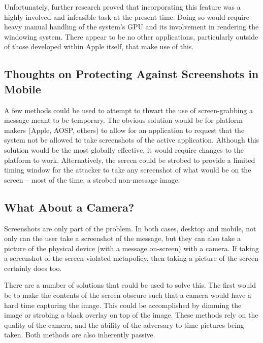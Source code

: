 \documentclass[11pt, a4paper,titlepage]{report}
\begin{document}
Unfortunately, further research proved that incorporating this feature was a highly involved and infeasible task at the present time. Doing so would require heavy manual handling of the system's GPU and its involvement in rendering the windowing system. There appear to be no other applications, particularly outside of those developed within Apple itself, that make use of this.

\subsection*{Thoughts on Protecting Against Screenshots in Mobile} 
A few methods could be used to attempt to thwart the use of screen-grabbing a message meant to be temporary. The obvious solution would be for platform-makers (Apple, AOSP, others) to allow for an application to request that the system not be allowed to take screenshots of the active application. Although this solution would be the most globally effective, it would require changes to the platform to work. Alternatively, the screen could be strobed to provide a limited timing window for the attacker to take any screenshot of what would be on the screen -- most of the time, a strobed non-message image.

\subsection*{What About a Camera?}

Screenshots are only part of the problem. In both cases, desktop and mobile, not only can the user take a screenshot of the message, but they can also take a picture of the physical device (with a message on-screen) with a camera. If taking a screenshot of the screen violated metapolicy, then taking a picture of the screen certainly does too. 

There are a number of solutions that could be used to solve this. The first would be to make the contents of the screen obscure such that a camera would have a hard time capturing the image. This could be accomplished by dimming the image or strobing a black overlay on top of the image. These methods rely on the quality of the camera, and the ability of the adversary to time pictures being taken. Both methods are also inherently passive.
\end{document}
